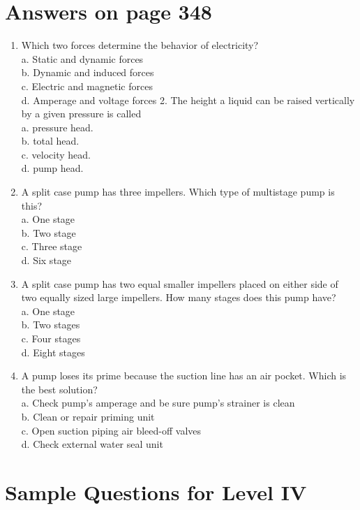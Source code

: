 \documentclass[10pt]{article}
\begin{document}
\section{Answers on page 348}
\begin{enumerate}
  \item Which two forces determine the behavior of electricity?\\
a. Static and dynamic forces\\
b. Dynamic and induced forces\\
c. Electric and magnetic forces\\
d. Amperage and voltage forces 2. The height a liquid can be raised vertically by a given pressure is called\\
a. pressure head.\\
b. total head.\\
c. velocity head.\\
d. pump head.

  \item A split case pump has three impellers. Which type of multistage pump is this?\\
a. One stage\\
b. Two stage\\
c. Three stage\\
d. Six stage

  \item A split case pump has two equal smaller impellers placed on either side of two equally sized large impellers. How many stages does this pump have?\\
a. One stage\\
b. Two stages\\
c. Four stages\\
d. Eight stages

  \item A pump loses its prime because the suction line has an air pocket. Which is the best solution?\\
a. Check pump's amperage and be sure pump's strainer is clean\\
b. Clean or repair priming unit\\
c. Open suction piping air bleed-off valves\\
d. Check external water seal unit

\end{enumerate}

\section{Sample Questions for Level IV}
\end{document}
